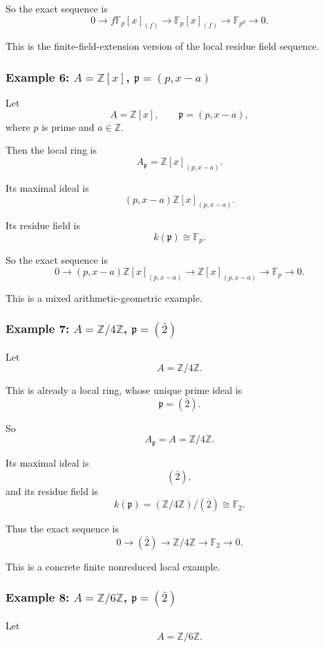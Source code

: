\documentclass[12pt,a4paper]{article}
\theoremstyle{notespace}
\newcommand{\mf}{\mathfrak}
\theoremstyle{definition}
\begin{document}
So the exact sequence is
\[
0
\longrightarrow
f\mathbb F_p[x]_{(f)}
\longrightarrow
\mathbb F_p[x]_{(f)}
\longrightarrow
\mathbb F_{p^d}
\longrightarrow 0.
\]

This is the finite-field-extension version of the local residue field sequence.

\subsubsection{Example 6: \(A=\mathbb Z[x]\), \(\mf p=(p,x-a)\)}

Let
\[
A=\mathbb Z[x],
\qquad
\mf p=(p,x-a),
\]
where \(p\) is prime and \(a\in \mathbb Z\).

Then the local ring is
\[
A_{\mf p}=\mathbb Z[x]_{(p,x-a)}.
\]

Its maximal ideal is
\[
(p,x-a)\mathbb Z[x]_{(p,x-a)}.
\]

Its residue field is
\[
k(\mf p)\cong \mathbb F_p.
\]

So the exact sequence is
\[
0
\longrightarrow
(p,x-a)\mathbb Z[x]_{(p,x-a)}
\longrightarrow
\mathbb Z[x]_{(p,x-a)}
\longrightarrow
\mathbb F_p
\longrightarrow 0.
\]

This is a mixed arithmetic-geometric example.

\subsubsection{Example 7: \(A=\mathbb Z/4\mathbb Z\), \(\mf p=(\bar 2)\)}

Let
\[
A=\mathbb Z/4\mathbb Z.
\]

This is already a local ring, whose unique prime ideal is
\[
\mf p=(\bar 2).
\]

So
\[
A_{\mf p}=A=\mathbb Z/4\mathbb Z.
\]

Its maximal ideal is
\[
(\bar 2),
\]
and its residue field is
\[
k(\mf p)=(\mathbb Z/4\mathbb Z)/(\bar 2)\cong \mathbb F_2.
\]

Thus the exact sequence is
\[
0
\longrightarrow
(\bar 2)
\longrightarrow
\mathbb Z/4\mathbb Z
\longrightarrow
\mathbb F_2
\longrightarrow 0.
\]

This is a concrete finite nonreduced local example.

\subsubsection{Example 8: \(A=\mathbb Z/6\mathbb Z\), \(\mf p=(\bar 2)\)}

Let
\[
A=\mathbb Z/6\mathbb Z.
\]
\end{document}

